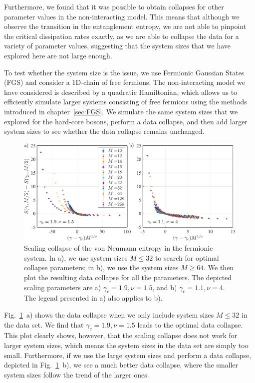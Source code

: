 Furthermore, we found that it was possible to obtain collapses for other parameter values in the non-interacting model. This means that although we observe the transition in the entanglement entropy, we are not able to pinpoint the critical dissipation rates exactly, as we are able to collapse the data for a variety of parameter values, suggesting that the system sizes that we have explored here are not large enough. 

To test whether the system size is the issue, we use Fermionic Gaussian States (FGS) and consider a 1D-chain of free fermions. The non-interacting model we have considered is described by a quadratic Hamiltonian, which allows us to efficiently simulate larger systems consisting of free fermions using the methods introduced in chapter~\ref{sec:FGS}. We simulate the same system sizes that we explored for the hard-core bosons, perform a data collapse, and then add larger system sizes to see whether the data collapse remains unchanged. 

\begin{figure}[ht]
    \centering
    \includegraphics[width=\textwidth]{Chapters/Plots/Chapter4/Chapter3_Fig6.pdf}
    \caption{Scaling collapse of the von Neumann entropy in the fermionic system. In a), we use system sizes $M \leq 32$ to search for optimal collapse parameters; in b), we use the system sizes $M \geq 64$. We then plot the resulting data collapse for all the parameters. The depicted scaling parameters are a) $\gamma_c = 1.9, \nu = 1.5$, and b) $\gamma_c = 1.1, \nu = 4$. The legend presented in a) also applies to b).}
    \label{fig:Chapter3_Fig6}
\end{figure}

Fig.~\ref{fig:Chapter3_Fig6}~a) shows the data collapse when we only include system sizes $M \leq 32$ in the data set. We find that $\gamma_c = 1.9, \nu = 1.5$ leads to the optimal data collapse. This plot clearly shows, however, that the scaling collapse does not work for larger system sizes, which means the system sizes in the data set are simply too small. Furthermore, if we use the large system sizes and perform a data collapse, depicted in Fig.~\ref{fig:Chapter3_Fig6}~b), we see a much better data collapse, where the smaller system sizes follow the trend of the larger ones. 

